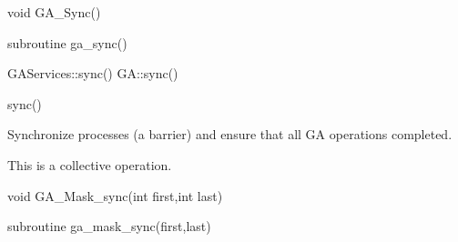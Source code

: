 \documentclass[12pt]{article}
\begin{document}

\begin{capi}
\begin{ccode}
void GA_Sync()
\end{ccode}
\end{capi}

\begin{fapi}
\begin{fcode}
subroutine ga_sync()
\end{fcode}
\end{fapi}

\begin{cxxapi}
\begin{cxxcode}
GAServices::sync()
GA::sync()
\end{cxxcode}
\end{cxxapi}

\begin{pyapi}
\begin{pycode}
sync()
\end{pycode}
\end{pyapi}
\dcoll

\begin{desc}

Synchronize processes (a barrier) and ensure that all GA operations completed.

This is a collective operation.

\end{desc}


\begin{capi}
\begin{ccode}
void GA_Mask_sync(int first,int last)
\end{ccode}
\begin{funcargs}
\end{funcargs}
\end{capi}

\begin{fapi}
\begin{fcode}
subroutine ga_mask_sync(first,last)
\end{fcode}
\begin{funcargs}
\end{funcargs}
\end{fapi}
\end{document}
